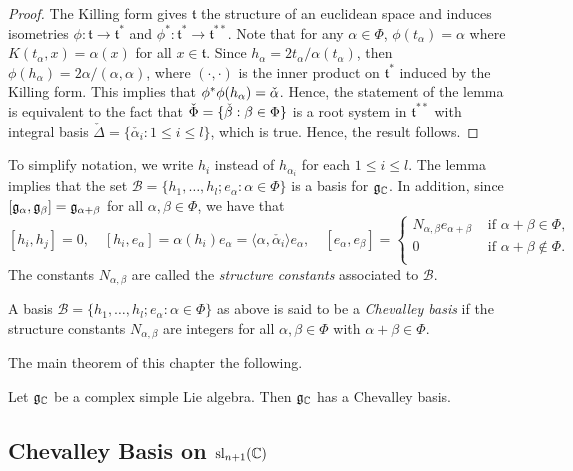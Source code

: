 \begin{proof}
    The Killing form gives $\mathfrak{t}$ the structure of an euclidean space and induces isometries $\phi:\mathfrak{t}\to\mathfrak{t}^*$ and $\phi^*:\mathfrak{t}^*\to\mathfrak{t}^{**}$. Note that for any $\alpha\in\Phi$, $\phi(t_\alpha)=\alpha$ where $K(t_\alpha,x)=\alpha(x)$ for all $x\in\mathfrak{t}$. Since $h_\alpha=2t_\alpha/\alpha(t_\alpha)$, then $\phi(h_\alpha)=2\alpha/(\alpha,\alpha)$, where $(\cdot,\cdot)$ is the inner product on $\mathfrak{t}^*$ induced by the Killing form. This implies that $\phi^*\phi(h_\alpha)=\check{\alpha}$. Hence, the statement of the lemma is equivalent to the fact that $\check{\Phi}=\{\check{\beta}:\beta\in\Phi\}$ is a root system in $\mathfrak{t}^{**}$ with integral basis $\check{\Delta}=\{\check{\alpha_i}:1\leq i\leq l\}$, which is true. Hence, the result follows.
\end{proof}

To simplify notation, we write $h_i$ instead of $h_{\alpha_i}$ for each $1\leq i\leq l$. The lemma implies that the set $\mathcal{B}=\{h_1,\ldots,h_l;e_\alpha:\alpha\in\Phi\}$ is a basis for $\mathfrak{g}_{\mathbb{C}}$. In addition, since $[\mathfrak{g}_\alpha,\mathfrak{g}_\beta]=\mathfrak{g}_{\alpha+\beta}$ for all $\alpha,\beta\in\Phi$, we have that 
$$[h_i,h_j]=0,\quad[h_i,e_\alpha]=\alpha(h_i)e_\alpha=\langle\alpha,\check{\alpha_i}\rangle e_\alpha,\quad[e_\alpha,e_\beta]=\begin{cases}
    N_{\alpha,\beta}e_{\alpha+\beta} & \text{ if } \alpha+\beta\in\Phi,\\
    0 & \text{ if }\alpha+\beta\notin\Phi.\\
\end{cases}$$
The constants $N_{\alpha,\beta}$ are called the \textit{structure constants} associated to $\mathcal{B}$.

\begin{definition}
    A basis $\mathcal{B}=\{h_1,\ldots,h_l;e_\alpha:\alpha\in\Phi\}$ as above is said to be a \textit{Chevalley basis} if the structure constants $N_{\alpha,\beta}$ are integers for all $\alpha,\beta\in\Phi$ with $\alpha+\beta\in\Phi$.
\end{definition}

The main theorem of this chapter the following.

\begin{theorem}[Chevalley, 1955]
    Let $\mathfrak{g}_{\mathbb{C}}$ be a complex simple Lie algebra. Then $\mathfrak{g}_{\mathbb{C}}$ has a Chevalley basis.
\end{theorem}

\subsection{Chevalley Basis on \texorpdfstring{$\mathrm{sl}_{n+1}(\mathbb{C})$}{PDFstring}}\label{sec:chevbasis_sl}

